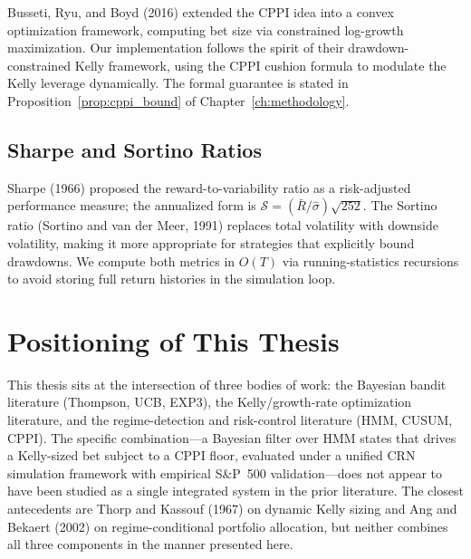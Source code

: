 Busseti, Ryu, and Boyd (2016) extended the CPPI idea into a convex optimization
framework, computing bet size via constrained log-growth maximization.  Our
implementation follows the spirit of their drawdown-constrained Kelly framework,
using the CPPI cushion formula to modulate the Kelly leverage dynamically.  The
formal guarantee is stated in Proposition~\ref{prop:cppi_bound} of
Chapter~\ref{ch:methodology}.

\subsection{Sharpe and Sortino Ratios}

Sharpe (1966) proposed the reward-to-variability ratio as a risk-adjusted
performance measure; the annualized form is
$\mathcal{S} = (\bar{R}/\hat\sigma)\sqrt{252}$.  The Sortino ratio (Sortino
and van der Meer, 1991) replaces total volatility with downside volatility,
making it more appropriate for strategies that explicitly bound drawdowns.
We compute both metrics in $O(T)$ via running-statistics recursions to avoid
storing full return histories in the simulation loop.

\section{Positioning of This Thesis}

This thesis sits at the intersection of three bodies of work: the Bayesian
bandit literature (Thompson, UCB, EXP3), the Kelly/growth-rate optimization
literature, and the regime-detection and risk-control literature (HMM, CUSUM,
CPPI).  The specific combination---a Bayesian filter over HMM states that
drives a Kelly-sized bet subject to a CPPI floor, evaluated under a unified
CRN simulation framework with empirical S\&P~500 validation---does not appear
to have been studied as a single integrated system in the prior literature.
The closest antecedents are Thorp and Kassouf (1967) on dynamic Kelly sizing
and Ang and Bekaert (2002) on regime-conditional portfolio allocation, but
neither combines all three components in the manner presented here.
